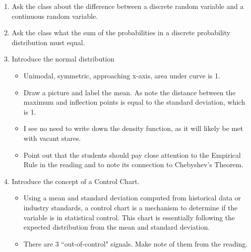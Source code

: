 \documentclass{article}
\begin{document}
    \begin{enumerate}
    
        \item Ask the class about the difference between a discrete random variable and a continuous random variable.
        
        \item Ask the class what the sum of the probabilities in a discrete probability distribution must equal.
        
        \item Introduce the normal distribution
        
            \begin{itemize}
            
                \item Unimodal, symmetric, approaching x-axis, area under curve is 1.  
                
                \item Draw a picture and label the mean. As note the distance between the maximum and inflection points is equal to the standard deviation, which is 1.
                
                \item I see no need to write down the density function, as it will likely be met with vacant stares.
                
                \item Point out that the students should pay close attention to the Empirical Rule in the reading and to note its connection to Chebyshev’s Theorem.
            
            \end{itemize}
            
        \item Introduce the concept of a Control Chart.
        
            \begin{itemize}
            
                \item Using a mean and standard deviation computed from historical data or industry standards, a control chart is a mechanism to determine if the variable is in statistical control. This chart is essentially following the expected distribution from the mean and standard deviation.
                
                \item There are 3 ``out-of-control" signals. Make note of them from the reading.
                

\end{itemize}
\end{enumerate}
\end{document}
